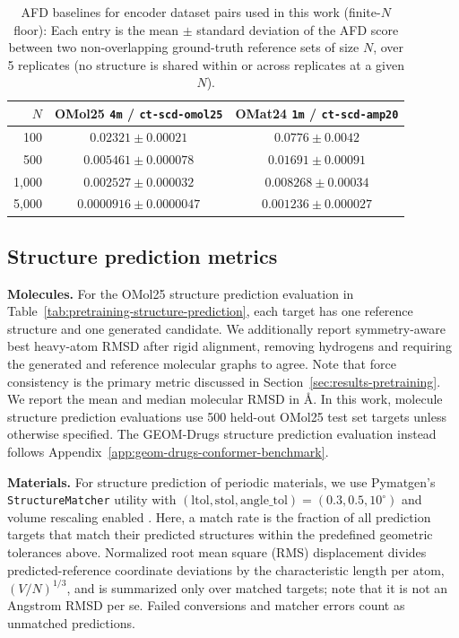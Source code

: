\documentclass{article} %
\begin{document}
\begin{table}[H]
\centering
\small
\caption{AFD baselines for encoder dataset pairs used in this work (finite-$N$ floor): Each entry is the mean $\pm$ standard deviation of the AFD score between two non-overlapping ground-truth reference sets of size $N$, over 5 replicates (no structure is shared within or across replicates at a given $N$).}

\label{tab:afd_baselines}
\begin{tabular}{r c c}
\toprule
$N$ & OMol25 \texttt{4m} / \texttt{ct-scd-omol25} & OMat24 \texttt{1m} / \texttt{ct-scd-amp20} \\
\midrule
100     & $0.02321 \pm 0.00021$   & $0.0776 \pm 0.0042$    \\
500     & $0.005461 \pm 0.000078$ & $0.01691 \pm 0.00091$  \\
1{,}000 & $0.002527 \pm 0.000032$ & $0.008268 \pm 0.00034$ \\
5{,}000 & $0.0000916 \pm 0.0000047$ & $0.001236 \pm 0.000027$ \\
\bottomrule
\end{tabular}
\end{table}

\subsection{Structure prediction metrics}
\label{app:metrics-structure-prediction}

\textbf{Molecules.} For the OMol25 structure prediction evaluation in Table~\ref{tab:pretraining-structure-prediction}, each target has one reference structure and one generated candidate. We additionally report symmetry-aware best heavy-atom RMSD after rigid alignment, removing hydrogens and requiring the generated and reference molecular graphs to agree. Note that force consistency is the primary metric discussed in Section~\ref{sec:results-pretraining}. We report the mean and median molecular RMSD in \AA. In this work, molecule structure prediction evaluations use 500 held-out OMol25 test set targets unless otherwise specified. The GEOM-Drugs structure prediction evaluation instead follows Appendix~\ref{app:geom-drugs-conformer-benchmark}.

\textbf{Materials.} For structure prediction of periodic materials, we use Pymatgen's \texttt{StructureMatcher} utility with $(\mathrm{ltol},\mathrm{stol},\mathrm{angle\_tol})=(0.3,0.5,10^\circ)$ and volume rescaling enabled \citep{ong2013pymatgen}. Here, a match rate is the fraction of all prediction targets that match their predicted structures within the predefined geometric tolerances above. Normalized root mean square (RMS) displacement divides predicted-reference coordinate deviations by the characteristic length per atom, $(V/N)^{1/3}$, and is summarized only over matched targets; note that it is not an Angstrom RMSD per se. Failed conversions and matcher errors count as unmatched predictions.
\end{document}
